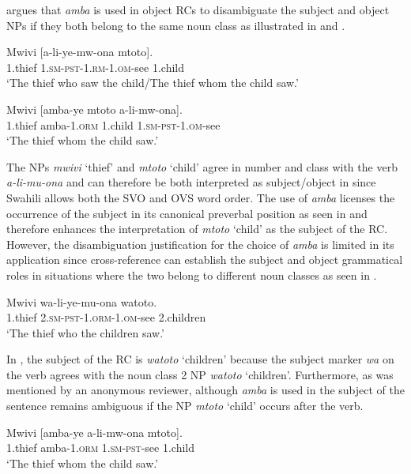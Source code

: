 \documentclass[output=paper,colorlinks,citecolor=brown]{langscibook}
\begin{document}
\citet[125--126]{Russell1992} argues that \textit{amba} is used in object RCs to disambiguate the subject and object NPs if they both belong to the same noun class as illustrated in  and .

\ea%
    \label{ex:mwamzandi:8}
    \gll    Mwivi [a-li-ye-mw-ona mtoto].\\
            1.thief  \textsc{1.sm-pst-1.rm-1.om-}see  1.child\\
    \glt    ‘The thief who saw the child/The thief whom the child saw.’
\z

\ea%
    \label{ex:mwamzandi:9}
    \gll    Mwivi [amba-ye mtoto a-li-mw-ona].\\
            1.thief  amba\textsc{-1.orm} 1.child \textsc{1.sm-pst-1.om-}see\\
    \glt    ‘The thief whom the child saw.’
\z

The NPs \textit{mwivi} ‘thief’ and \textit{mtoto} ‘child’ agree in number and class with the verb \textit{a-li-mu-ona} and can therefore be both interpreted as subject/object in  since Swahili allows both the SVO and OVS word order. The use of \textit{amba} licenses the occurrence of the subject in its canonical preverbal position as seen in  and therefore enhances the interpretation of \textit{mtoto} ‘child’ as the subject of the RC. However, the disambiguation justification for the choice of \textit{amba} is limited in its application since cross-reference can establish the subject and object grammatical roles in situations where the two belong to different noun classes as seen in .

\ea%
    \label{ex:mwamzandi:10}
    \gll    Mwivi wa-li-ye-mu-ona watoto.\\
            1.thief  \textsc{2.sm-pst-1.orm-1.om-}see 2.children\\
    \glt    ‘The thief who the children saw.’
\z

In , the subject of the RC is \textit{watoto} ‘children’ because the subject marker \textit{wa} on the verb agrees with the noun class 2 NP \textit{watoto} ‘children’. Furthermore, as was mentioned by an anonymous reviewer, although \textit{amba} is used in  the subject of the sentence remains ambiguous if the NP \textit{mtoto} ‘child’ occurs after the verb.

\ea%
    \label{ex:mwamzandi:11}
    \gll    Mwivi [amba-ye a-li-mw-ona mtoto].\\
            1.thief  amba\textsc{-1.orm} \textsc{1.sm-pst-}see 1.child\\
    \glt    ‘The thief whom the child saw.’
\z
\end{document}
